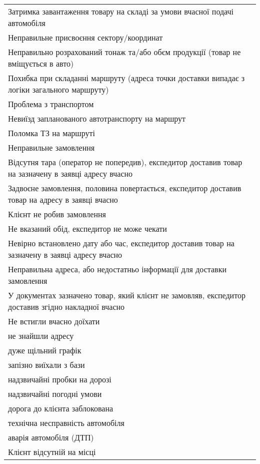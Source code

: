 \begin{longtable}[c]{ | p{16cm} | }
	\nopagebreak\quad Затримка завантаження товару на складі за умови вчасної подачі автомобіля \\
	\nopagebreak\quad Неправильне присвоєння сектору/координат \\
	\nopagebreak\quad Неправильно розрахований тонаж та/або обєм продукції (товар не вміщується в авто) \\
	\nopagebreak\quad Похибка при складанні маршруту (адреса точки доставки випадає з логіки загального маршруту) \\
	\hline
	Проблема з транспортом \\
	\nopagebreak\quad Невиїзд запланованого автотранспорту на маршрут \\
	\nopagebreak\quad Поломка ТЗ на маршруті \\
	\hline
	Неправильне замовлення \\
	\nopagebreak\quad Відсутня тара (оператор не попередив), експедитор доставив товар на зазначену в заявці адресу вчасно \\
	\nopagebreak\quad Задвоєне замовлення, половина повертається, експедитор доставив товар на адресу в заявці вчасно \\
	\nopagebreak\quad Клієнт не робив замовлення \\
	\nopagebreak\quad Не вказаний обід, експедитор не може чекати \\
	\nopagebreak\quad Невірно встановлено дату або час, експедитор доставив товар на зазначену в заявці адресу вчасно \\
	\nopagebreak\quad Неправильна адреса, або недостатньо інформації для доставки замовлення \\
	\nopagebreak\quad У документах зазначено товар, який клієнт не замовляв, експедитор доставив згідно накладної вчасно \\
	\hline
	Не встигли вчасно доїхати \\
	\hline
	не знайшли адресу \\
	\hline
	дуже щільний графік \\
	\hline
	запізно виїхали з бази \\
	\hline
	надзвичайні пробки на дорозі \\
	\hline
	надзвичайні погодні умови  \\
	\hline
	дорога до клієнта заблокована \\
	\hline
	технічна несправність автомобіля  \\
	\hline
	аварія автомобіля (ДТП) \\
	\hline
	Клієнт відсутній на місці \\

\end{longtable}

